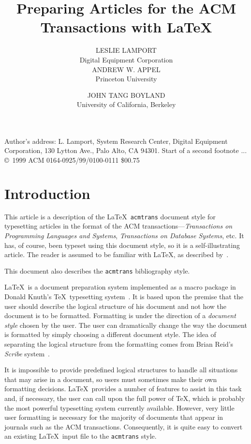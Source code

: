 \documentclass[hyperref]{acmtrans2e}
\title{Preparing Articles for the ACM Transactions
with \LaTeX}
\author{LESLIE LAMPORT\\Digital Equipment Corporation\\
ANDREW W. APPEL\\Princeton University \and
JOHN TANG BOYLAND\\University of California, Berkeley}
\begin{document}
\setcounter{page}{111}

\begin{bottomstuff}
Author's address: L. Lamport, System Research Center,
Digital Equipment Corporation, 130 Lytton Ave., Palo Alto, CA 94301.\newline
Start of a second footnote ...
\permission
\copyright\ 1999 ACM 0164-0925/99/0100-0111 \$00.75
\end{bottomstuff}
\maketitle

\section{Introduction}

This article is a description of the \LaTeX\ {\tt acmtrans} document
style for typesetting articles in the format of the ACM
transactions---{\em Transactions on Programming Languages and
Systems}, {\em Transactions on Database Systems}, etc.  It has, of
course, been typeset using this document style, so it is a
self-illustrating article.  The reader is assumed to be familiar
with \LaTeX, as described by~.

This document also describes the {\tt acmtrans} bibliography style.

\LaTeX\ is a document preparation system
implemented as a macro package in Donald Knuth's
\TeX\ typesetting system~\cite{knuth:texbook}.  It is based
upon the premise that the user should describe the logical structure of
his document and not how the document is to be formatted.  Formatting
is under the direction of a {\em document style} chosen by the user.
The user can dramatically change the way the document is formatted by
simply choosing a different document style.  The idea of separating the
logical structure from the formatting comes from Brian Reid's {\em
Scribe\/} system~\cite{reid:scribe}.  


It is impossible to provide predefined logical structures to handle all
situations that may arise in a document, so users must sometimes make
their own formatting decisions.  \LaTeX\ provides a number of features
to assist in this task and, if necessary, the user can call upon the
full power of \TeX, which is probably the most powerful typesetting
system currently available.  However, very little user formatting is
necessary for the majority of documents that appear in journals such as
the ACM transactions.  Consequently, it is quite easy to convert
an existing \LaTeX\ input file to the {\tt acmtrans} style.
\end{document}
